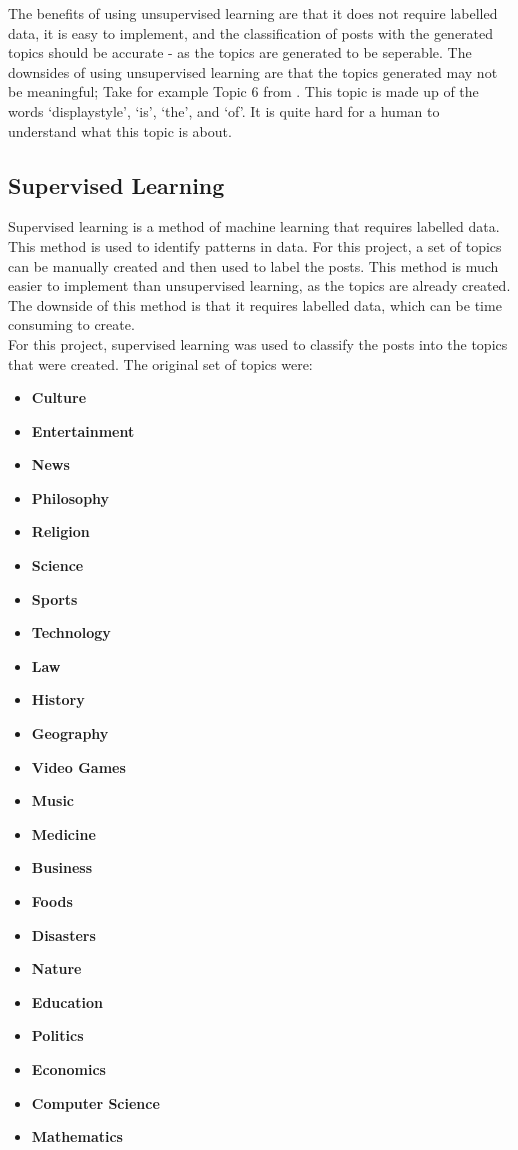The benefits of using unsupervised learning are that it does not require labelled data, it is easy to implement, and the classification
of posts with the generated topics should be accurate - as the topics are generated to be seperable. The downsides of using unsupervised
learning are that the topics generated may not be meaningful; Take for example Topic 6 from . This topic is made up
of the words `displaystyle', `is', `the', and `of'. It is quite hard for a human to understand what this topic is about.

\subsection{Supervised Learning}
Supervised learning is a method of machine learning that requires labelled data. This method is used to identify patterns in data.
For this project, a set of topics can be manually created and then used to label the posts. This method is much easier to implement
than unsupervised learning, as the topics are already created. The downside of this method is that it requires labelled data, which
can be time consuming to create.\\

For this project, supervised learning was used to classify the posts into the topics that were created. The original set of topics were:
\begin{multicols}{2}
\begin{itemize}
    \item \textbf{Culture}
    \item \textbf{Entertainment}
    \item \textbf{News}
    \item \textbf{Philosophy}
    \item \textbf{Religion}
    \item \textbf{Science}
    \item \textbf{Sports}
    \item \textbf{Technology}
    \item \textbf{Law}
    \item \textbf{History}
    \item \textbf{Geography}
    \item \textbf{Video Games}
    \item \textbf{Music}
    \item \textbf{Medicine}
    \item \textbf{Business}
    \item \textbf{Foods}
    \item \textbf{Disasters}
    \item \textbf{Nature}
    \item \textbf{Education}
    \item \textbf{Politics}
    \item \textbf{Economics}
    \item \textbf{Computer Science}
    \item \textbf{Mathematics}
\end{itemize}
\end{multicols}

